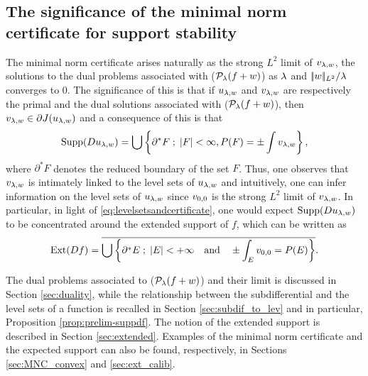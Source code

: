 \subsection{The significance of the minimal norm certificate for support stability}
 The minimal norm certificate arises naturally as the strong $L^2$ limit of $v_{\lambda,w}$, the solutions to the dual problems associated with ($\mathcal{P}_\lambda(f+w)$) as $\lambda$ and $|\!| w |\!|_{L^2}/\lambda$ converges to 0.  The significance of this is that if $u_{\lambda,w}$ and $v_{\lambda,w}$ are respectively the primal and the dual solutions associated with ($\mathcal{P}_\lambda(f+w)$), then $v_{\lambda,w} \in \partial J(u_{\lambda,w})$ and a consequence of this is that
\begin{equation}\label{eq:levelsetsandcertificate}
\operatorname{Supp}(D u_{\lambda,w}) = \bigcup \left\{ \partial^* F \;;\;  \left| F \right|<\infty, P(F) = \pm\int v_{\lambda,w} \right\},
\end{equation}
where $\partial^* F$ denotes the reduced boundary of the set $F$. Thus, one observes that $v_{\lambda,w}$ is intimately linked to the level sets of $u_{\lambda,w}$ and intuitively, one can infer information on the level sets of $u_{\lambda,w}$ since $v_{0,0}$ is the strong $L^2$ limit of $v_{\lambda,w}$. In particular, in light of \eqref{eq:levelsetsandcertificate}, one would expect  $\operatorname{Supp}(D u_{\lambda,w})$ to be concentrated around the extended support of $f$, which can be written as
$$
  \operatorname{Ext}(Df) = \overline{\bigcup\left\{ \partial^*E \;;\; \left| E \right|<+\infty \quad \text{and} \quad  \pm\int_E v_{0,0} =P(E) \right\}}.
$$

 The dual problems associated to ($\mathcal{P}_\lambda(f+w)$) and their limit is discussed in Section \ref{sec:duality}, while the relationship between the subdifferential and the level sets of a function is recalled in  Section \ref{sec:subdif_to_lev} and in particular, Proposition \ref{prop:prelim-suppdf}. 
  The notion of the extended support is described in Section \ref{sec:extended}.  Examples of the minimal norm certificate and the expected support can also be found, respectively, in Sections \ref{sec:MNC_convex} and \ref{sec:ext_calib}. 

